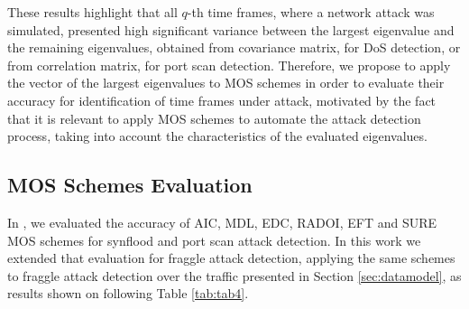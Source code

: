 \documentclass{bmcart}
\begin{document}
These results highlight that all $q$-th time frames, where a network attack was simulated, presented high significant variance between the largest eigenvalue and the remaining eigenvalues, obtained from covariance matrix, for DoS detection, or from correlation matrix, for port scan detection. Therefore, we propose to apply the vector of the largest eigenvalues to MOS schemes in order to evaluate their accuracy for identification of time frames under attack, motivated by the fact that it is relevant to apply MOS schemes to automate the attack detection process, taking into account the characteristics of the evaluated eigenvalues.

\subsection{MOS Schemes Evaluation}
\label{sec:MOSSchemesEvaluation}

In \cite{tenorio2013greatest}, we evaluated the accuracy of AIC, MDL, EDC, RADOI, EFT and SURE MOS schemes \cite{da2009comparison,tenorio2013greatest} for synflood and port scan attack detection. In this work we extended that evaluation for fraggle attack detection, applying the same schemes to fraggle attack detection over the traffic presented in Section \ref{sec:datamodel}, as results shown on following Table \ref{tab:tab4}.
\end{document}

